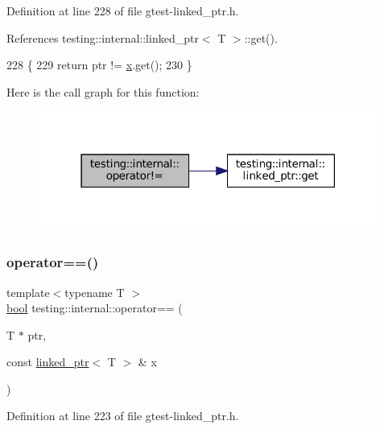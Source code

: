Definition at line 228 of file gtest-\/linked\+\_\+ptr.\+h.



References testing\+::internal\+::linked\+\_\+ptr$<$ T $>$\+::get().


\begin{DoxyCode}
228                                                 \{
229   \textcolor{keywordflow}{return} ptr != \hyperlink{namespaceinteractive__marker_acda52804aef30b460a72fb21ee01d69d}{x}.get();
230 \}
\end{DoxyCode}
Here is the call graph for this function\+:
\nopagebreak
\begin{figure}[H]
\begin{center}
\leavevmode
\includegraphics[width=316pt]{namespacetesting_1_1internal_a6910869259f8f31825b471e9190fa09a_cgraph}
\end{center}
\end{figure}
\mbox{\label{namespacetesting_1_1internal_ad1cb54a206a209ddace17a05359d38ae}} 
\subsubsection{\texorpdfstring{operator==()}{operator==()}}
{\footnotesize\ttfamily template$<$typename T $>$ \\
\hyperlink{classbool}{bool} testing\+::internal\+::operator== (\begin{DoxyParamCaption}\item[{T $\ast$}]{ptr,  }\item[{const \hyperlink{classtesting_1_1internal_1_1linked__ptr}{linked\+\_\+ptr}$<$ T $>$ \&}]{x }\end{DoxyParamCaption})\hspace{0.3cm}{\ttfamily [inline]}}



Definition at line 223 of file gtest-\/linked\+\_\+ptr.\+h.



